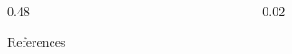 \documentclass[final]{beamer}
\newlength{\twocolwid}
\begin{document}
\begin{frame}[t]
\begin{columns}[t]
\begin{column}{\twocolwid}
\begin{columns}[t,totalwidth=\twocolwid]
\begin{column}{0.48\twocolwid}
\begin{block}{\large{References}}
\begin{footnotesize}




\end{footnotesize}

\end{block}


%
%
%
%


\end{column}

\begin{column}{0.02\twocolwid}
\end{column}


\end{columns}

\end{column} %



\end{columns} %

\end{frame} %
\end{document}
